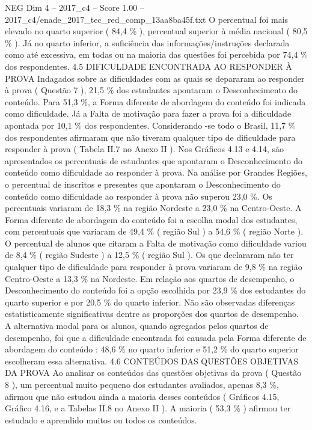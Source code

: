 \begin{textsample}{NEG Dim 4 – 2017\_c4 – Score 1.00 – 2017\_c4/enade\_2017\_tec\_red\_comp\_13aa8ba45f.txt}
O percentual foi mais elevado no quarto superior ( 84,4 \% ), percentual superior à média nacional ( 80,5 \% ).
Já no quarto inferior, a suficiência das informações/instruções declarada como até excessiva, em todas ou na maioria das questões foi percebida por 74,4 \% dos respondentes. 4.5 DIFICULDADE ENCONTRADA AO RESPONDER À PROVA Indagados sobre as dificuldades com as quais se depararam ao responder à prova ( Questão 7 ), 21,5 \% dos estudantes apontaram o Desconhecimento do conteúdo.
Para 51,3 \%, a Forma diferente de abordagem do conteúdo foi indicada como dificuldade.
Já a Falta de motivação para fazer a prova foi a dificuldade apontada por 10,1 \% dos respondentes.
Considerando -se todo o Brasil, 11,7 \% dos respondentes afirmaram que não tiveram qualquer tipo de dificuldade para responder à prova ( Tabela II.7 no Anexo II ).
Nos Gráficos 4.13 e 4.14, são apresentados os percentuais de estudantes que apontaram o Desconhecimento do conteúdo como dificuldade ao responder à prova.
Na análise por Grandes Regiões, o percentual de inscritos e presentes que apontaram o Desconhecimento do conteúdo como dificuldade ao responder à prova não superou 23,0 \%.
Os percentuais variaram de 18,3 \% na região Nordeste a 23,0 \% na Centro-Oeste.
A Forma diferente de abordagem do conteúdo foi a escolha modal dos estudantes, com percentuais que variaram de 49,4 \% ( região Sul ) a 54,6 \% ( região Norte ).
O percentual de alunos que citaram a Falta de motivação como dificuldade variou de 8,4 \% ( região Sudeste ) a 12,5 \% ( região Sul ).
Os que declararam não ter qualquer tipo de dificuldade para responder à prova variaram de 9,8 \% na região Centro-Oeste a 13,3 \% na Nordeste.
Em relação aos quartos de desempenho, o Desconhecimento do conteúdo foi a opção escolhida por 23,9 \% dos estudantes do quarto superior e por 20,5 \% do quarto inferior.
Não são observadas diferenças estatisticamente significativas dentre as proporções dos quartos de desempenho.
A alternativa modal para os alunos, quando agregados pelos quartos de desempenho, foi que a dificuldade encontrada foi causada pela Forma diferente de abordagem do conteúdo : 48,6 \% no quarto inferior e 51,2 \% do quarto superior escolheram essa alternativa. 4.6 CONTEÚDOS DAS QUESTÕES OBJETIVAS DA PROVA Ao analisar os conteúdos das questões objetivas da prova ( Questão 8 ), um percentual muito pequeno dos estudantes avaliados, apenas 8,3 \%, afirmou que não estudou ainda a maioria desses conteúdos ( Gráficos 4.15, Gráfico 4.16, e a Tabelas II.8 no Anexo II ).
A maioria ( 53,3 \% ) afirmou ter estudado e aprendido muitos ou todos os conteúdos.

\end{textsample}
